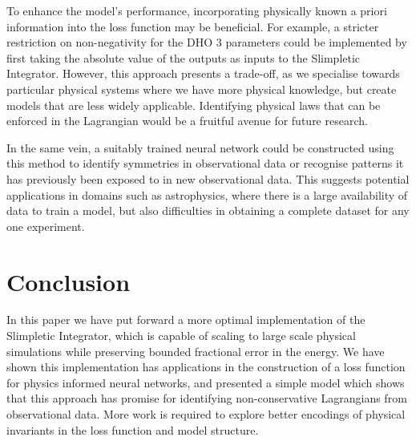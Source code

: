 To enhance the model's performance, incorporating physically known a priori information into the loss function may be beneficial. For example, a stricter restriction on non-negativity for the DHO 3 parameters could be implemented by first taking the absolute value of the outputs as inputs to the Slimpletic Integrator. However, this approach presents a trade-off, as we specialise towards particular physical systems where we have more physical knowledge, but create models that are less widely applicable. Identifying physical laws that can be enforced in the Lagrangian would be a fruitful avenue for future research.

In the same vein, a suitably trained neural network could be constructed using this method to identify symmetries in observational data or recognise patterns it has previously been exposed to in new observational data. This suggests potential applications in domains such as astrophysics, where there is a large availability of data to train a model, but also difficulties in obtaining a complete dataset for any one experiment.

\section{Conclusion}

In this paper we have put forward a more optimal implementation of the Slimpletic Integrator, which is capable of scaling to large scale physical simulations while preserving bounded fractional error in the energy. We have shown this implementation has applications in the construction of a loss function for physics informed neural networks, and presented a simple model which shows that this approach has promise for identifying non-conservative Lagrangians from observational data. More work is required to explore better encodings of physical invariants in the loss function and model structure.
